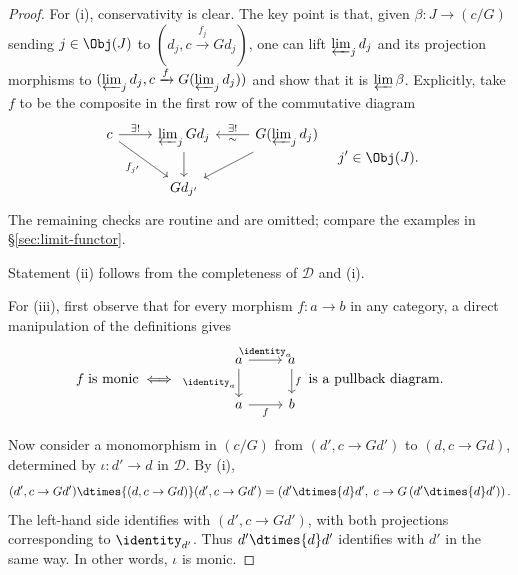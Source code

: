 \begin{proof}
	For (i), conservativity is clear. The key point is that, given
	$\beta:J\to(c/G)$ sending $j\in\Obj(J)$ to
	$(d_j,c\xrightarrow{f_j}Gd_j)$, one can lift $\varprojlim_jd_j$ and its
	projection morphisms to
	$(\varprojlim_jd_j,c\xrightarrow{f}G(\varprojlim_jd_j))$ and show that it
	is $\varprojlim\beta$. Explicitly, take $f$ to be the composite in the
	first row of the commutative diagram
	\[\begin{tikzcd}
		c \arrow[r, "{\exists!}"] \arrow[rd, "{f_{j'}}"'] & \varprojlim_j Gd_j \arrow[d] & G (\varprojlim_j d_j) \arrow[l, "\exists!"', "\sim"] \arrow[ld] \\
		& Gd_{j'} &
	\end{tikzcd} \quad j' \in \Obj(J). \]
	The remaining checks are routine and are omitted; compare the examples in
	\S\ref{sec:limit-functor}.

	Statement (ii) follows from the completeness of $\mathcal{D}$ and (i).

	For (iii), first observe that for every morphism $f:a\to b$ in any
	category, a direct manipulation of the definitions gives
	\[ f \;\text{is monic} \iff
	\begin{tikzcd}
		a \arrow[r, "\identity_a"] \arrow[d, "\identity_a"'] & a \arrow[d, "f"] \\
		a \arrow[r, "f"'] & b
	\end{tikzcd} \;\text{is a pullback diagram}. \]

	Now consider a monomorphism in $(c/G)$ from $(d',c\to Gd')$ to
	$(d,c\to Gd)$, determined by $\iota:d'\to d$ in $\mathcal{D}$. By (i),
	\[ (d', c \to Gd') \dtimes{(d, c \to Gd)} (d', c \to Gd') = \left( d' \dtimes{d} d' , \; c \to G\left( d' \dtimes{d} d' \right) \right) . \]
	The left-hand side identifies with $(d',c\to Gd')$, with both projections
	corresponding to $\identity_{d'}$. Thus $d'\dtimes{d}d'$ identifies with
	$d'$ in the same way. In other words, $\iota$ is monic.
\end{proof}

